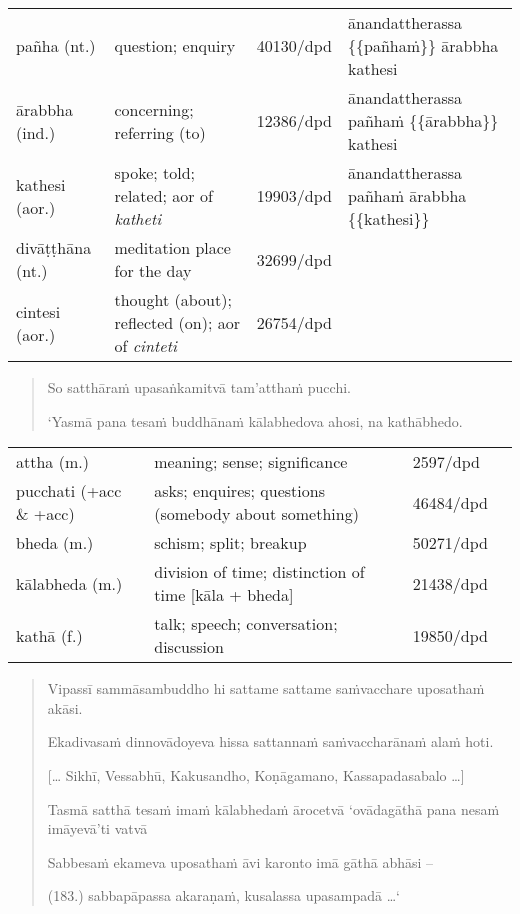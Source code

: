 \documentclass[11pt,oneside]{memoir}
\begin{document}
\begin{longtable}{L{\colOne} L{\colTwo} H H}
pañha (nt.) & question; enquiry & 40130/dpd & ānandattherassa \{\{pañhaṁ\}\} ārabbha kathesi\\[0pt]
ārabbha (ind.) & concerning; referring (to) & 12386/dpd & ānandattherassa pañhaṁ \{\{ārabbha\}\} kathesi\\[0pt]
kathesi (aor.) & spoke; told; related; aor of \emph{katheti} & 19903/dpd & ānandattherassa pañhaṁ ārabbha \{\{kathesi\}\}\\[0pt]
divāṭṭhāna (nt.) & meditation place for the day & 32699/dpd & \\[0pt]
cintesi (aor.) & thought (about); reflected (on); aor of \emph{cinteti} & 26754/dpd & \\[0pt]
\end{longtable}

\clearpage
\casesLegendHeaderBGHere

\begin{quote}
So satthāraṁ upasaṅkamitvā tam'atthaṁ pucchi.

`Yasmā pana tesaṁ buddhānaṁ kālabhedova ahosi, na kathābhedo.
\end{quote}

\begin{longtable}{L{\colOne} L{\colTwo} H H}
attha (m.) & meaning; sense; significance & 2597/dpd & \\[0pt]
pucchati (+acc \& +acc) & asks; enquires; questions (somebody about something) & 46484/dpd & \\[0pt]
bheda (m.) & schism; split; breakup & 50271/dpd & \\[0pt]
kālabheda (m.) & division of time; distinction of time [kāla + bheda] & 21438/dpd & \\[0pt]
kathā (f.) & talk; speech; conversation; discussion & 19850/dpd & \\[0pt]
\end{longtable}

\begin{quote}
Vipassī sammāsambuddho hi sattame sattame saṁvacchare uposathaṁ akāsi.

Ekadivasaṁ dinnovādoyeva hissa sattannaṁ saṁvaccharānaṁ alaṁ hoti.

[\ldots{} Sikhī, Vessabhū, Kakusandho, Koṇāgamano, Kassapadasabalo \ldots{}]

Tasmā satthā tesaṁ imaṁ kālabhedaṁ ārocetvā `ovādagāthā pana nesaṁ imāyevā'ti vatvā

Sabbesaṁ ekameva uposathaṁ āvi karonto imā gāthā abhāsi –

(183.) sabbapāpassa akaraṇaṁ, kusalassa upasampadā \ldots{}`
\end{quote}
\end{document}
